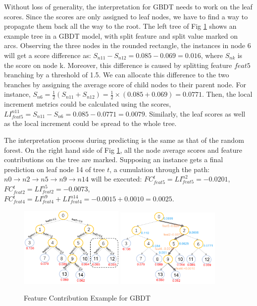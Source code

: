 Without loss of generality, the interpretation for GBDT needs to work on the 
leaf scores. Since the scores are only assigned
to leaf nodes, we have to find a way to propagate them back all the way to the root. The left tree of Fig \ref{figgbdt} shows an example
tree in a GBDT model, with split feature and split value marked on arcs. Observing the three nodes in the rounded rectangle, 
the instances in node 6 will get a score difference as: $S_{n11}-S_{n12}=0.085-0.069=0.016$, where $S_{nk}$ is the score on node k. 
Moreover, this difference is caused by splitting feature $feat5$ branching by a threshold of 1.5. We can allocate this difference to the
two branches by assigning the average score of child nodes to their parent node. For instance, $S_{n6}=\frac{1}{2}(S_{n11}+S_{n12})=\frac{1}{2}\times(0.085+0.069)=0.0771$.
Then, the local increment metrics could be calculated using the scores,  $LI_{feat5}^{n11}=S_{n11}-S_{n6}=0.085-0.0771=0.0079$.
Similarly, the leaf scores as well as  the local increment  could be spread 
to the whole tree.

The interpretation process during predicting is the same as that of the random forest.  On the right hand side of Fig \ref{figgbdt},  all the node average scores and  feature contributions
on the tree are marked. Supposing an instance gets a final prediction on leaf node 14 of tree $t$, a cumulation through the path: $n0\rightarrow n2\rightarrow n5\rightarrow n9\rightarrow n14$
will be executed: $FC{}_{feat5}^{t}=LI_{feat5}^{n2}=-0.0201$, $FC{}_{feat2}^{t}=LI_{feat2}^{n5}=-0.0073$,$FC{}_{feat4}^{t}=LI_{feat4}^{n9}+LI_{feat4}^{n14}=-0.0015+0.0010=0.0025$.
 

\begin{figure}[htbp]
 \centering
 \includegraphics[width=0.45\textwidth]{pic/gbdttree.png}
 \includegraphics[width=0.45\textwidth]{pic/gbdtfc.png}
   \caption{Feature Contribution Example for GBDT}\label{figgbdt}
\end{figure}

